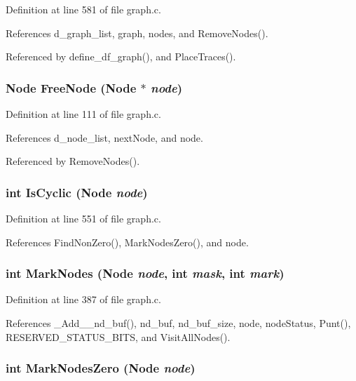 Definition at line 581 of file graph.c.

References d\_\-graph\_\-list, graph, nodes, and Remove\-Nodes().

Referenced by define\_\-df\_\-graph(), and Place\-Traces().
\subsubsection{\setlength{\rightskip}{0pt plus 5cm}\bf{Node} Free\-Node (\bf{Node} $\ast$ {\em node})}\label{graph_8h_26179fc2f0d21aa44b2e5a57265a52c5}




Definition at line 111 of file graph.c.

References d\_\-node\_\-list, next\-Node, and node.

Referenced by Remove\-Nodes().
\subsubsection{\setlength{\rightskip}{0pt plus 5cm}int Is\-Cyclic (\bf{Node} {\em node})}\label{graph_8h_756ebc836e841a3d41ccd454c890b331}




Definition at line 551 of file graph.c.

References Find\-Non\-Zero(), Mark\-Nodes\-Zero(), and node.
\subsubsection{\setlength{\rightskip}{0pt plus 5cm}int Mark\-Nodes (\bf{Node} {\em node}, int {\em mask}, int {\em mark})}\label{graph_8h_8fb02f1b857bea9d9bf0cc9f163d9bb3}




Definition at line 387 of file graph.c.

References \_\-Add\_\_\-nd\_\-buf(), nd\_\-buf, nd\_\-buf\_\-size, node, node\-Status, Punt(), RESERVED\_\-STATUS\_\-BITS, and Visit\-All\-Nodes().
\subsubsection{\setlength{\rightskip}{0pt plus 5cm}int Mark\-Nodes\-Zero (\bf{Node} {\em node})}\label{graph_8h_ddaa36b43cfefe9f2f46d221162e2118}




